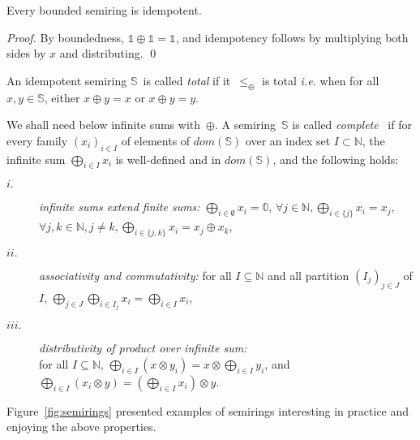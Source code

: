 \documentclass[runningheads]{llncs}
\def\ie{\textit{i.e.}\xspace}
\newcommand{\Semiring}{\mathbb{S}}
\newcommand{\zero}{\mathbb{0}}
\newcommand{\one}{\mathbb{1}}
\newcommand{\dom}{\ensuremath{\mathit{dom}}}
\begin{document}
\begin{lemma}
Every bounded semiring is idempotent.
\end{lemma}
\begin{proof}
By boundedness, $\one \oplus \one = \one$, 
and idempotency follows by multiplying
both sides by $x$ and distributing. 
\qed
\end{proof}

\noindent
An idempotent semiring $\Semiring$~is called \emph{total} if
it~$\leq_\oplus$ is total
\ie when for all $x, y \in \Semiring$, either $x \oplus y = x$ or $x \oplus y = y$.

We shall need below infinite sums with~$\oplus$.
A semiring~$\Semiring$ is called \emph{complete}~\cite{Kuich97semirings}
if for every family
$(x_i)_{i \in I}$ %
of elements of $\dom(\Semiring)$ over an index set $I \subset \mathbb{N}$,
the infinite sum $\bigoplus_{i \in I} x_i$
is well-defined and in $\dom(\Semiring)$,
and the following holds: %
\begin{description}
\item[$i.$]
\emph{infinite sums extend finite sums:}
$\displaystyle\bigoplus_{i \in \emptyset} x_i = \zero$,\quad 
      $\forall j\in \mathbb{N}, \displaystyle\bigoplus_{i \in \{ j \}} x_i = x_j$,\quad
      $\forall j, k\in \mathbb{N}, j\neq k, 
      \displaystyle\bigoplus_{i \in \{ j, k \}} x_i = x_j \oplus x_k$,
%
\item[$ii.$]
\emph{associativity and commutativity:}
for all $I \subseteq \mathbb{N}$
and all partition $(I_{j})_{j \in J}$ of $I$, %
\(
\displaystyle
\bigoplus_{j \in J}\bigoplus_{i \in I_j} x_i = 
\bigoplus_{i \in I} x_i
\),
%
\item[$iii.$] 
\emph{distributivity of product over infinite sum:}\\
for all $I \subseteq \mathbb{N}$,
\(
\displaystyle
\bigoplus_{i \in I} (x \otimes y_i) = x \otimes \bigoplus_{i\in I} y_i\), and
\(
\displaystyle
\bigoplus_{i \in I} (x_i \otimes y) = (\bigoplus_{i \in I} x_i ) \otimes y\).
\end{description}



\begin{example}
Figure~\ref{fig:semirings} presented examples of semirings interesting in practice 
and enjoying the above properties.
\end{example}
\end{document}
